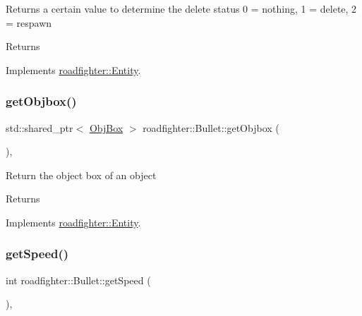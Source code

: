 Returns a certain value to determine the delete status 0 = nothing, 1 = delete, 2 = respawn \begin{DoxyReturn}{Returns}

\end{DoxyReturn}


Implements \hyperlink{classroadfighter_1_1Entity_a08190b0b8e6a3fcdb42273d6096152ac}{roadfighter\+::\+Entity}.

\mbox{\label{classroadfighter_1_1Bullet_a3e410865547614ec0470eb6ad18cc2c4}} 
\subsubsection{\texorpdfstring{get\+Objbox()}{getObjbox()}}
{\footnotesize\ttfamily std\+::shared\+\_\+ptr$<$ \hyperlink{structObjBox}{Obj\+Box} $>$ roadfighter\+::\+Bullet\+::get\+Objbox (\begin{DoxyParamCaption}{ }\end{DoxyParamCaption})\hspace{0.3cm}{\ttfamily [override]}, {\ttfamily [virtual]}}

Return the object box of an object \begin{DoxyReturn}{Returns}

\end{DoxyReturn}


Implements \hyperlink{classroadfighter_1_1Entity_af14340d04a725175a6d221f23c35fa0c}{roadfighter\+::\+Entity}.

\mbox{\label{classroadfighter_1_1Bullet_ad05d66d01f1f839e1f38c6f12a0b091b}} 
\subsubsection{\texorpdfstring{get\+Speed()}{getSpeed()}}
{\footnotesize\ttfamily int roadfighter\+::\+Bullet\+::get\+Speed (\begin{DoxyParamCaption}{ }\end{DoxyParamCaption})\hspace{0.3cm}{\ttfamily [override]}, {\ttfamily [virtual]}}

